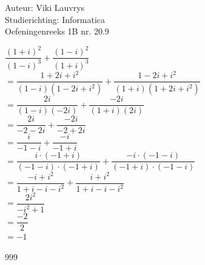 \documentclass[a4paper]{article}
\begin{document}
  
\noindent \large Auteur: Viki Lauvrys        \\
\noindent \large Studierichting: Informatica \\
\noindent \large Oefeningenreeks 1B nr. 20.9 \\

\medskip

\normalsize
$\dfrac{(1 + i)^2}{(1 - i)^3} + \dfrac{(1 - i)^2}{(1 + i)^3}$ \\

$ = \dfrac{1 + 2i + i^2}{(1 - i)(1 - 2i + i^2)} + \dfrac{1 - 2i + i^2}{(1 + i)(1 + 2i + i^2)} $ \\

$ = \dfrac{2i}{(1 - i)(-2i)} + \dfrac{-2i}{(1 + i)(2i)} $ \\

$ = \dfrac{2i}{-2 -2i} + \dfrac{-2i}{-2 +2i} $ \\

$ = \dfrac{i}{-1 -i} + \dfrac{-i}{-1 +i} $ \\

$ = \dfrac{i \cdot (-1 +i)}{(-1 -i) \cdot (-1 +i)} + \dfrac{-i \cdot (-1 -i)}{(-1 +i) \cdot (-1 -i)} $ \\

$ = \dfrac{-i + i^2}{1 + i - i -i^2} + \dfrac{i + i^2}{1 + i - i -i^2} $ \\

$ = \dfrac{2i^2}{-i^2 +1} $ \\

$ = \dfrac{-2}{2} $ \\

$ = -1 $ \\


\begin{thebibliography}{999}
\end{thebibliography}
\end{document}
